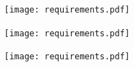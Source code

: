 \documentclass[english,12pt,a4paper,pdftex]{article}
\newenvironment{wide}{%
  \begin{list}{}{%
      \setlength{\topsep}{0pt}%
      \addtolength{\leftmargin}{-2cm}%
      \addtolength{\rightmargin}{-2cm}%
      \setlength{\listparindent}{\parindent}%
      \setlength{\itemindent}{\parindent}%
      \setlength{\parsep}{\parskip}}%
  \item[]%
}{%
  \end{list}%
}
\begin{document}
\begin{wide}
\begin{figure}[htb]
\begin{center}
\texttt{[image: requirements.pdf]}
\end{center}
\end{figure}
\end{wide}

\begin{wide}
\begin{figure}[htb]
\begin{center}
\texttt{[image: requirements.pdf]}
\end{center}
\end{figure}
\end{wide}

\begin{wide}
\begin{figure}[htb]
\begin{center}
\texttt{[image: requirements.pdf]}
\end{center}
\end{figure}
\end{wide}
\end{document}
